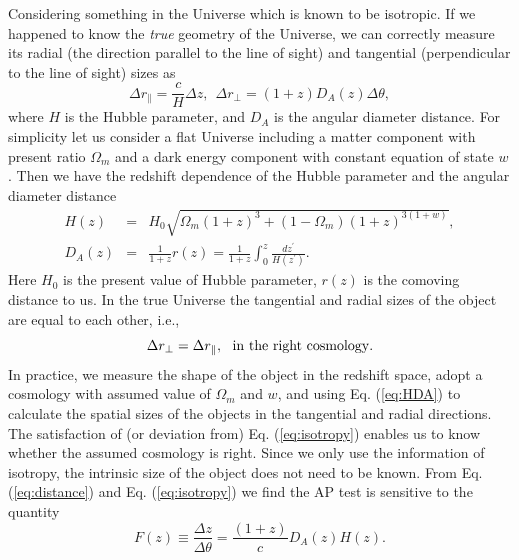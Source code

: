 \documentclass{emulateapj}
\begin{document}
Considering something in the Universe which is known to be isotropic.
If we happened to know the {\it true} geometry of the Universe, we can correctly measure its radial 
(the direction parallel to the line of sight) 
and tangential (perpendicular to the line of sight) sizes as
\begin{equation}\label{eq:distance}
\Delta r_{\parallel} = \frac{c}{H}\Delta z,\ \ \Delta r_{\bot}=(1+z)D_A(z)\Delta \theta,
\end{equation}
where $H$ is the Hubble parameter, and $D_A$ is the angular diameter distance.
For simplicity let us consider a flat Universe including a matter component with present ratio $\Omega_m$
and a dark energy component with constant equation of state $w$.
Then we have the redshift dependence of the Hubble parameter and the angular diameter distance
\begin{eqnarray}\label{eq:HDA}
 H(z) &=& H_0\sqrt{\Omega_m(1+z)^3+(1-\Omega_m)(1+z)^{3(1+w)}},\nonumber\\ 
 D_A(z) &=& \frac{1}{1+z}r(z)=\frac{1}{1+z}\int_0^z \frac{dz^\prime}{H(z^\prime)}.
\end{eqnarray}
Here $H_0$ is the present value of Hubble parameter,
$r(z)$ is the comoving distance to us.
In the true Universe the tangential and radial sizes of the object are equal to each other, i.e.,
\begin{equation}\label{eq:isotropy}
\Delta r_{\bot}=\Delta r_{\parallel},\ {\rm\ in\ the\ right\ cosmology}.
\end{equation}
In practice, we measure the shape of the object in the redshift space,
adopt a cosmology with assumed value of $\Omega_m$ and $w$, 
and using Eq. (\ref{eq:HDA}) to calculate the spatial sizes of the objects in the tangential and radial directions.
The satisfaction of (or deviation from) Eq. (\ref{eq:isotropy}) enables us to know whether the assumed cosmology is right.
Since we only use the information of isotropy, the intrinsic size of the object does not need to be known.
From Eq. (\ref{eq:distance}) and Eq. (\ref{eq:isotropy}) we find the AP test is sensitive to the quantity
\begin{equation}\label{eq:Fz}
F(z)\equiv\frac{\Delta z}{\Delta \theta}=\frac{(1+z)}{c}D_A(z)H(z).
\end{equation}
\end{document}
